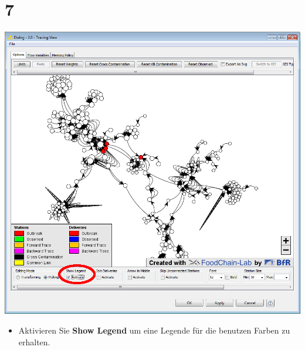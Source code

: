 \documentclass{beamer}
\begin{document}
\section{7}
\begin{frame}
	\begin{center}
  		\includegraphics[height=0.6\textheight]{7.png}
	\end{center}
	\begin{itemize}
		\item Aktivieren Sie \textbf{Show Legend} um eine Legende für die benutzen Farben zu erhalten.
	\end{itemize}
\end{frame}
\end{document}
